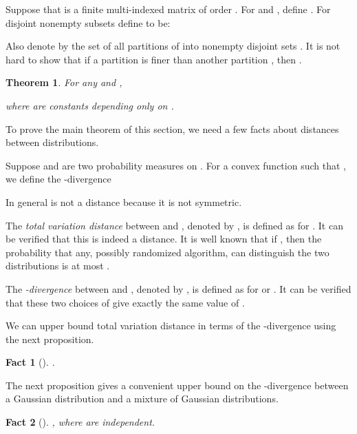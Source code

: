 \documentclass[11pt]{article}
\newtheorem{theorem}{Theorem}
\newtheorem{fact}{Fact}
\begin{document}
Suppose that  is a finite multi-indexed matrix of order . For  and , define . For disjoint nonempty subsets  define  to be:

Also denote by  the set of all partitions of  into  nonempty disjoint sets . It is not hard to
show that if a partition 
 is finer than another partition , 
then .

\begin{theorem}\label{thm:latala}
For any  and ,

where  are constants depending only on .
\end{theorem}

To prove the main theorem of this section, we need a few facts about distances between distributions. 

Suppose  and  are two probability measures on . 
For a convex function  such that , we define the -divergence

In general  is not a distance because it is not symmetric. 

The \textit{total variation distance} between  and , denoted by , 
is defined as  for . It can be verified that this is indeed a distance. It 
is well known that if , then the probability that any, possibly randomized
algorithm, can distinguish the two distributions is at most . 

The \textit{-divergence} between  and , denoted by , 
is defined as  for  or . 
It can be verified that these two choices of  give exactly the same value of .

We can upper bound total variation distance in terms of the -divergence using the next proposition.
\begin{fact}[{\cite[p90]{Tsybakov}}] \label{prop:TV_chi^2}
.
\end{fact}

The next proposition gives a convenient upper bound on the -divergence between a Gaussian distribution
and a mixture of Gaussian distributions. 
\begin{fact}[{\cite[p97]{IS}}] \label{prop:chi^2}
, where  are independent.
\end{fact}
\end{document}
